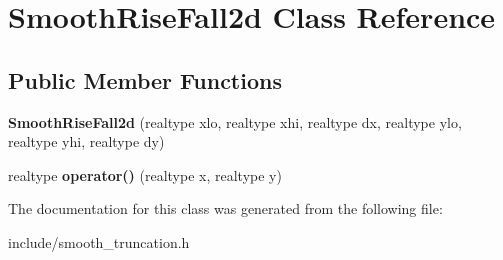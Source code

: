 \hypertarget{classSmoothRiseFall2d}{\section{Smooth\+Rise\+Fall2d Class Reference}
\label{classSmoothRiseFall2d}
}
\subsection*{Public Member Functions}
\begin{DoxyCompactItemize}
\item 
\hypertarget{classSmoothRiseFall2d_a7ae192a8aa0ca45cd357ea98922adc52}{{\bfseries Smooth\+Rise\+Fall2d} (realtype xlo, realtype xhi, realtype dx, realtype ylo, realtype yhi, realtype dy)}\label{classSmoothRiseFall2d_a7ae192a8aa0ca45cd357ea98922adc52}

\item 
\hypertarget{classSmoothRiseFall2d_a9a02b072859fd0d0dacebde8f2d63f60}{realtype {\bfseries operator()} (realtype x, realtype y)}\label{classSmoothRiseFall2d_a9a02b072859fd0d0dacebde8f2d63f60}

\end{DoxyCompactItemize}


The documentation for this class was generated from the following file\+:\begin{DoxyCompactItemize}
\item 
include/smooth\+\_\+truncation.\+h\end{DoxyCompactItemize}
